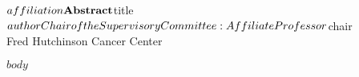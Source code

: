 \begin{center}
${affiliation} \\
\vspace{0.5cm}
\textbf{Abstract} \\
\vspace{0.5cm}
${title} \\
\vspace{0.5cm}
${author} \\
\vspace{0.5cm}
Chair of the Supervisory Committee: \\
Affiliate Professor ${chair} \\
Fred Hutchinson Cancer Center
\end{center}
$body$
